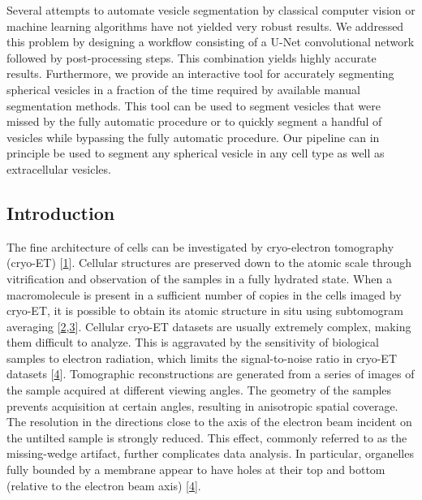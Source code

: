 Several attempts to automate vesicle segmentation by classical computer vision or machine learning algorithms have not yielded very robust results.
We addressed this problem by designing a workflow consisting of a U-Net convolutional network followed by post-processing steps.
This combination yields highly accurate results.
Furthermore, we provide an interactive tool for accurately segmenting spherical vesicles in a fraction of the time required by available manual segmentation methods.
This tool can be used to segment vesicles that were missed by the fully automatic procedure or to quickly segment a handful of vesicles while bypassing the fully automatic procedure.
Our pipeline can in principle be used to segment any spherical vesicle in any cell type as well as extracellular vesicles.

\hypertarget{introduction}{%
\subsection{Introduction}\label{introduction}}

The fine architecture of cells can be investigated by cryo-electron tomography (cryo-ET) {[}\protect\hyperlink{ref-IpfJPPLG}{1}{]}.
Cellular structures are preserved down to the atomic scale through vitrification and observation of the samples in a fully hydrated state.
When a macromolecule is present in a sufficient number of copies in the cells imaged by cryo-ET, it is possible to obtain its atomic structure in situ using subtomogram averaging {[}\protect\hyperlink{ref-2TrAHWcN}{2},\protect\hyperlink{ref-EGfvt7aR}{3}{]}.
Cellular cryo-ET datasets are usually extremely complex, making them difficult to analyze.
This is aggravated by the sensitivity of biological samples to electron radiation, which limits the signal-to-noise ratio in cryo-ET datasets {[}\protect\hyperlink{ref-WmTa9taa}{4}{]}.
Tomographic reconstructions are generated from a series of images of the sample acquired at different viewing angles.
The geometry of the samples prevents acquisition at certain angles, resulting in anisotropic spatial coverage.
The resolution in the directions close to the axis of the electron beam incident on the untilted sample is strongly reduced.
This effect, commonly referred to as the missing-wedge artifact, further complicates data analysis.
In particular, organelles fully bounded by a membrane appear to have holes at their top and bottom (relative to the electron beam axis) {[}\protect\hyperlink{ref-WmTa9taa}{4}{]}.

